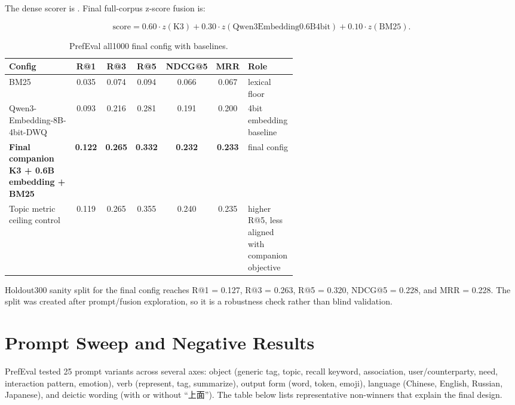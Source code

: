 \documentclass[11pt]{article}
\begin{document}
The dense scorer is . Final full-corpus
z-score fusion is:

\[
\mathrm{score} =
0.60 \cdot z(\mathrm{K3}) +
0.30 \cdot z(\mathrm{Qwen3Embedding0.6B4bit}) +
0.10 \cdot z(\mathrm{BM25}).
\]

\begin{table}[h]
\centering
\caption{PrefEval all1000 final config with baselines.}
\small
\begin{tabular}{p{0.38\linewidth}cccccp{0.18\linewidth}}
\toprule
Config & R@1 & R@3 & R@5 & NDCG@5 & MRR & Role \\
\midrule
BM25 & 0.035 & 0.074 & 0.094 & 0.066 & 0.067 & lexical floor \\
Qwen3-Embedding-8B-4bit-DWQ & 0.093 & 0.216 & 0.281 & 0.191 & 0.200 & 4bit embedding baseline \\
\textbf{Final companion K3 + 0.6B embedding + BM25} & \textbf{0.122} & \textbf{0.265} & \textbf{0.332} & \textbf{0.232} & \textbf{0.233} & final config \\
Topic metric ceiling control & 0.119 & 0.265 & 0.355 & 0.240 & 0.235 & higher R@5, less aligned with companion objective \\
\bottomrule
\end{tabular}
\end{table}

Holdout300 sanity split for the final config reaches R@1 = 0.127, R@3 =
0.263, R@5 = 0.320, NDCG@5 = 0.228, and MRR = 0.228. The split was created
after prompt/fusion exploration, so it is a robustness check rather than blind
validation.

\section{Prompt Sweep and Negative Results}

PrefEval tested 25 prompt variants across several axes: object
(generic tag, topic, recall keyword, association, user/counterparty, need,
interaction pattern, emotion), verb (represent, tag, summarize), output form
(word, token, emoji), language (Chinese, English, Russian, Japanese), and
deictic wording (with or without ``上面''). The table below lists
representative non-winners that explain the final design.
\end{document}
